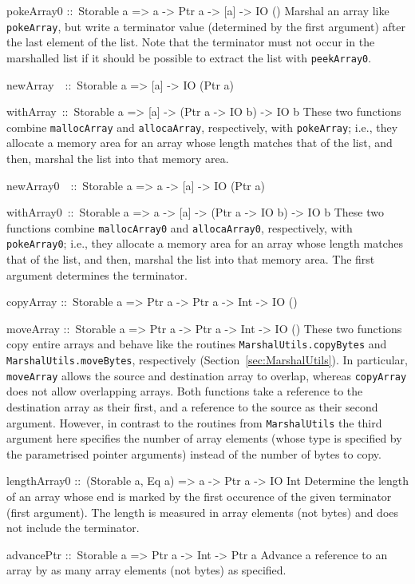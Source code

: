\documentclass[a4paper,twosides]{article}
\makeatletter
\newcommand{\code}[1]{\texttt{#1}}      %
\newenvironment{codedesc}{%
  \list{}{\labelwidth\z@
    \let\makelabel\codedesclabel}
  }{%
  \endlist
  }
\newcommand*{\codedesclabel}[1]{%
  \hspace{-\leftmargin}
  \parbox[b]{\labelwidth}{\makebox[0pt][l]{\code{#1}}\\}\hfil\relax
  }
\newcommand{\combineitems}{\vspace*{-\itemsep}\vspace*{-\parsep}\vspace*{-1em}}
\makeatother
\begin{document}
\begin{codedesc}
\item[pokeArray0 ::\ Storable a => a -> Ptr a -> {[a]} -> IO ()]
  Marshal an array like \code{pokeArray}, but write a terminator value
  (determined by the first argument) after the last element of the list.  Note
  that the terminator must not occur in the marshalled list if it should be
  possible to extract the list with \code{peekArray0}.

\item[newArray~~::\ Storable a => {[a]} -> IO (Ptr a)]
\item[withArray~::\ Storable a => {[a]} -> (Ptr a -> IO b) -> IO b]\combineitems
  These two functions combine \code{mallocArray} and \code{allocaArray},
  respectively, with \code{pokeArray}; i.e., they allocate a memory area for
  an array whose length matches that of the list, and then, marshal the list
  into that memory area.

\item[newArray0~~::\ Storable a => a -> {[a]} -> IO (Ptr a)]
\item[withArray0~::\ Storable a => a -> {[a]} -> (Ptr a -> IO b) -> IO b]\combineitems
  These two functions combine \code{mallocArray0} and \code{allocaArray0},
  respectively, with \code{pokeArray0}; i.e., they allocate a memory area for
  an array whose length matches that of the list, and then, marshal the list
  into that memory area.  The first argument determines the terminator.

\item[copyArray ::\ Storable a => Ptr a -> Ptr a -> Int -> IO ()]
\item[moveArray ::\ Storable a => Ptr a -> Ptr a -> Int -> IO ()]\combineitems
  These two functions copy entire arrays and behave like the routines
  \code{MarshalUtils.copyBytes} and \code{MarshalUtils.moveBytes},
  respectively (Section~\ref{sec:MarshalUtils}).  In particular,
  \code{moveArray} allows the source and destination array to overlap, whereas
  \code{copyArray} does not allow overlapping arrays.  Both functions take a
  reference to the destination array as their first, and a reference to the
  source as their second argument.  However, in contrast to the routines from
  \code{MarshalUtils} the third argument here specifies the number of array
  elements (whose type is specified by the parametrised pointer arguments)
  instead of the number of bytes to copy.
  
\item[lengthArray0 ::\ (Storable a, Eq a) => a -> Ptr a -> IO Int] Determine
  the length of an array whose end is marked by the first occurence of the
  given terminator (first argument). The length is measured in array elements
  (not bytes) and does not include the terminator.
  
\item[advancePtr ::\ Storable a => Ptr a -> Int -> Ptr a] Advance a reference
  to an array by as many array elements (not bytes) as specified.
\end{codedesc}
\end{document}
